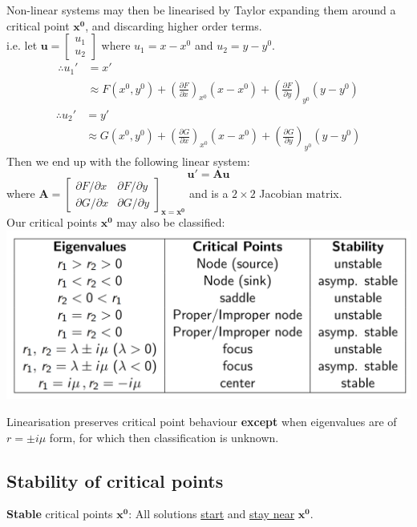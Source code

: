 \documentclass{article}
\begin{document}
Non-linear systems may then be linearised by Taylor expanding them around a critical point $\boldsymbol{x^0}$,
and discarding higher order terms. \\
i.e. let $\boldsymbol{u}=\begin{bmatrix} u_1 \\ u_2 \end{bmatrix}$ where $u_1=x-x^0$ and $u_2=y-y^0$.
\begin{align*}
    \therefore u_1 '&= x' \\ &\approx F(x^0, y^0)+\left(\frac{\partial F}{\partial x}\right)_{x^0}(x-x^0)
    +\left(\frac{\partial F}{\partial y}\right)_{y^0}(y-y^0)
\end{align*}
\begin{align*}
    \therefore u_2 '&= y' \\ &\approx G(x^0, y^0)+\left(\frac{\partial G}{\partial x}\right)_{x^0}(x-x^0)
    +\left(\frac{\partial G}{\partial y}\right)_{y^0}(y-y^0)
\end{align*}
Then we end up with the following linear system:
$$\boldsymbol{u}' = \boldsymbol{A}\boldsymbol{u}$$
where $\boldsymbol{A}=\begin{bmatrix}
    \partial F/\partial x & \partial F/\partial y \\
    \partial G/\partial x & \partial G/\partial y
\end{bmatrix}_{\boldsymbol{x} = \boldsymbol{x^0}}$ and is a $2\times2$ Jacobian matrix. \\
    
Our critical points $\boldsymbol{x^0}$ may also be classified: \\
\includegraphics[scale=0.5]{f1.png}

Linearisation preserves critical point behaviour \textbf{except} when eigenvalues are of $r=\pm i\mu$ form,
for which then classification is unknown.

\newpage

\subsection{Stability of critical points}
\textbf{Stable} critical points $\boldsymbol{x^0}$: All solutions \underline{start} and \underline{stay near} $\boldsymbol{x^0}$.
    
\end{document}

